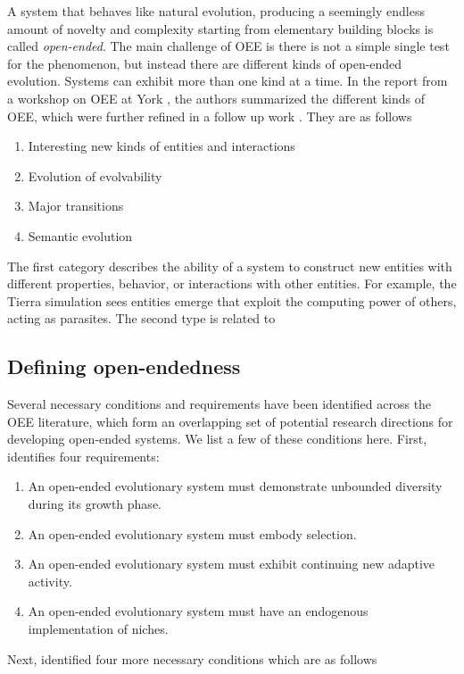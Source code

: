 A system that behaves like natural evolution, producing a seemingly endless
amount of novelty and complexity starting from elementary building blocks is
called \emph{open-ended}. The main challenge of \ac{OEE} is there is not a simple
single test for the phenomenon, but instead there are different kinds of
open-ended evolution. Systems can exhibit more than one kind at a time. In the
report from a workshop on \ac{OEE} at York
\parencite{taylorOpenEndedEvolutionPerspectives2016}, the authors summarized the
different kinds of \ac{OEE}, which were further refined in a follow up work
\parencite{packardOverviewOpenEndedEvolution2019}. They are as follows

\begin{enumerate}
  \item Interesting new kinds of entities and interactions
  \item Evolution of evolvability
  \item Major transitions
  \item Semantic evolution
\end{enumerate}

The first category describes the ability of a system to construct new entities
with different properties, behavior, or interactions with other entities. For
example, the Tierra simulation sees entities emerge that exploit the computing
power of others, acting as parasites. The second type is related to

\subsection{Defining open-endedness}

Several necessary conditions and requirements have been identified across the
\ac{OEE} literature, which form an overlapping set of potential research
directions for developing open-ended systems. We list a few of these conditions
here. First, \cite{maleyFourStepsOpenended1999} identifies four requirements:

\begin{enumerate}
  \item An open-ended evolutionary system must demonstrate unbounded diversity
        during its growth phase.
  \item An open-ended evolutionary system must embody selection.
  \item An open-ended evolutionary system must exhibit continuing new adaptive
        activity.
  \item An open-ended evolutionary system must have an endogenous implementation
        of niches.
\end{enumerate}
Next, \cite{sorosIdentifyingNecessaryConditions2014} identified four more necessary
conditions which are as follows

